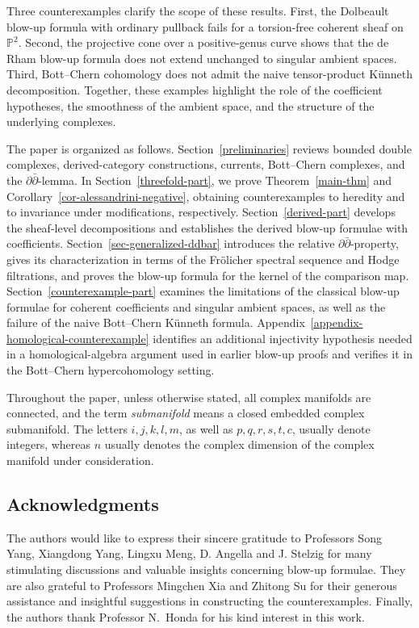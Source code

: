 \documentclass[11pt]{amsart}
\numberwithin{equation}{section}
\theoremstyle{plain}
\theoremstyle{definition}
\begin{document}
Three counterexamples clarify the scope of these results.  First, the
Dolbeault blow-up formula with ordinary pullback fails for a torsion-free
coherent sheaf on $\mathbb P^2$.  Second, the projective cone over a
positive-genus curve shows that the de Rham blow-up formula does not
extend unchanged to singular ambient spaces.  Third, Bott--Chern
cohomology does not admit the naive tensor-product K\"unneth decomposition.
Together, these examples highlight the role of the coefficient
hypotheses, the smoothness of the ambient space, and the structure of
the underlying complexes.

The paper is organized as follows.  Section~\ref{preliminaries} reviews
bounded double complexes, derived-category constructions, currents,
Bott--Chern complexes, and the $\partial\bar\partial$-lemma.
In Section~\ref{threefold-part}, we prove Theorem~\ref{main-thm} and
Corollary~\ref{cor-alessandrini-negative}, obtaining counterexamples to
heredity and to invariance under modifications, respectively.
Section~\ref{derived-part} develops the sheaf-level decompositions and
establishes the derived blow-up formulae with coefficients.
Section~\ref{sec-generalized-ddbar} introduces the relative
$\partial\bar\partial$-property, gives its characterization in terms of
the Fr\"olicher spectral sequence and Hodge filtrations, and proves the
blow-up formula for the kernel of the comparison map.
Section~\ref{counterexample-part} examines the limitations of the
classical blow-up formulae for coherent coefficients and singular
ambient spaces, as well as the failure of the naive Bott--Chern
K\"unneth formula. 
Appendix~\ref{appendix-homological-counterexample} identifies an
additional injectivity hypothesis needed in a homological-algebra
argument used in earlier blow-up proofs and verifies it in the
Bott--Chern hypercohomology setting.

Throughout the paper, unless otherwise stated, all complex manifolds
are connected, and the term \emph{submanifold} means a closed embedded
complex submanifold.  The letters $i,j,k,l,m$, as well as
$p,q,r,s,t,c$, usually denote integers, whereas $n$ usually denotes the complex
dimension of the complex manifold under consideration.

\subsection*{Acknowledgments}
The authors would like to express their sincere gratitude to Professors
Song Yang, Xiangdong Yang, Lingxu Meng, D. Angella and J. Stelzig for many stimulating discussions
and valuable insights concerning blow-up formulae.  They are also grateful
to Professors Mingchen Xia and Zhitong Su for their generous assistance and
insightful suggestions in constructing the counterexamples.
Finally, the authors thank Professor N.~Honda for his kind interest in this work.
\end{document}
